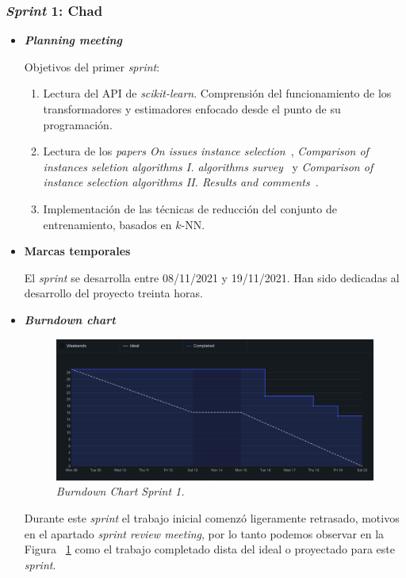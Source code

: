 \subsubsection{\textit{Sprint} 1: Chad}
\begin{itemize}
\item \textbf{\textit{Planning meeting}}

Objetivos del primer \textit{sprint}:
\begin{enumerate}
\item Lectura del API de \textit{scikit-learn}. Comprensión del funcionamiento de los transformadores y estimadores enfocado desde el punto de su programación.
\item Lectura de los \textit{papers On issues instance selection}~\cite{liu2002issues}, \textit{Comparison of instances seletion algorithms I. algorithms survey}~\cite{jankowski2004comparison} y \textit{Comparison of instance selection algorithms II. Results and comments}~\cite{grochowski2004comparison}.
\item Implementación de las técnicas de reducción del conjunto de entrenamiento, basados en $k$-NN.
\end{enumerate}

\item \textbf{Marcas temporales}

El \textit{sprint} se desarrolla entre 08/11/2021 y 19/11/2021. Han sido dedicadas al desarrollo del proyecto treinta horas.

\item \textbf{\textit{Burndown chart}}
\begin{figure}
\begin{center}
\includegraphics[width=\textwidth]{../img/anexos/sprints/BD-Sprint1}
\caption{\textit{Burndown Chart Sprint 1.}}\label{fig:BD-Sprint1}
\end{center}
\end{figure}
Durante este \textit{sprint} el trabajo inicial comenzó ligeramente retrasado, motivos en el apartado \textit{sprint review meeting}, por lo tanto podemos observar en la Figura ~\ref{fig:BD-Sprint1} como el trabajo completado dista del ideal o proyectado para este \textit{sprint}.


\end{itemize}
